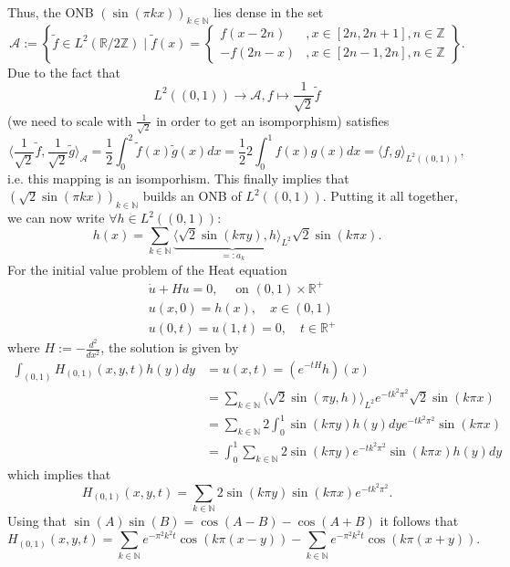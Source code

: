 \documentclass[A4,12pt,twoside]{book}
\begin{document}
Thus, the ONB $(\sin (\pi k x))_{k \in \mathbb{N}}$ lies dense in the set 
\[
\mathcal{A} := \left\{ \tilde{f} \in L^2 (\mathbb{R} / 2\mathbb{Z}) \mid \tilde{f} (x)= \begin{cases}
 f(x-2n) &, x \in [2n,2n+1], n \in \mathbb{Z}\\
    -f(2n-x)&, x \in [2n-1,2n], n \in \mathbb{Z}
\end{cases}  \right\}.
\]
Due to the fact that 
\[
L^2((0,1)) \to \mathcal{A}, f \mapsto \frac{1}{\sqrt{2}} \tilde{f}
\]
(we need to scale with $\frac{1}{\sqrt{2}}$ in order to get an isomporphism) satisfies 
\[
\langle \frac{1}{\sqrt{2}}\tilde{f},\frac{1}{\sqrt{2}}\tilde{g} \rangle_{\mathcal{A}} = \frac{1}{2} \int_0^2 \tilde{f}(x) \tilde{g}(x) dx =\frac{1}{2} 2 \int_0^1 f(x) g(x) dx =  \langle f,g  \rangle_{L^2((0,1))},
\]
i.e. this mapping is an isomporhism. This finally implies that $(\sqrt{2}\sin (\pi k x))_{k \in \mathbb{N}}$ builds an ONB of $L^2((0,1))$. Putting it all together, we can now write $\forall h \in L^2((0,1))$: 
\[
h(x) = \sum_{k \in \mathbb{N}} \underbrace{ \langle \sqrt{2} \sin (k \pi y) , h \rangle_{L^2} }_{=: a_k} \sqrt{2} \sin (k \pi x).
\]
For the initial value problem of the Heat equation 
\begin{align*}
    & \dot{u}+ Hu =0, \quad \text{ on } (0,1) \times \mathbb{R}^+ \\
    & u(x,0) = h(x), \quad x \in (0,1) \\
    & u(0,t)=u(1,t) =0, \quad t \in \mathbb{R}^+
\end{align*}
where $H:= - \frac{d^2}{dx^2}$, the solution is given by 
\begin{align*}
    \int_{(0,1)} H_{(0,1)} (x,y,t) h(y) dy &= u(x,t) = \left( e^{-tH} h \right)(x) \\
    &= \sum_{k \in \mathbb{N}} \langle \sqrt{2} \sin ( \pi y, h) \rangle_{L^2} e^{-t k^2 \pi^2} \sqrt{2} \sin (k\pi x) \\
    &= \sum_{k \in \mathbb{N}} 2 \int_0^1 \sin (k \pi y) h(y) dy e^{-t k^2 \pi^2} \sin (k \pi x) \\
    &= \int_0^1 \sum_{k \in \mathbb{N}} 2  \sin (k \pi y)   e^{-t k^2 \pi^2} \sin (k \pi x) h(y) dy
\end{align*}
which implies that 
\[
H_{(0,1)} (x,y,t) = \sum_{k \in \mathbb{N}} 2  \sin (k \pi y)    \sin (k \pi x) e^{-t k^2 \pi^2}.
\]
Using that $\sin (A) \sin (B) = \cos (A-B) - \cos (A+B)$ it follows that 
\[
H_{(0,1)} (x,y,t) = \sum_{k \in \mathbb{N}} e^{- \pi^2 k^2 t} \cos (k \pi (x-y)) - \sum_{k \in \mathbb{N}} e^{- \pi^2 k^2 t} \cos (k \pi (x+y)).
\]
\end{document}
